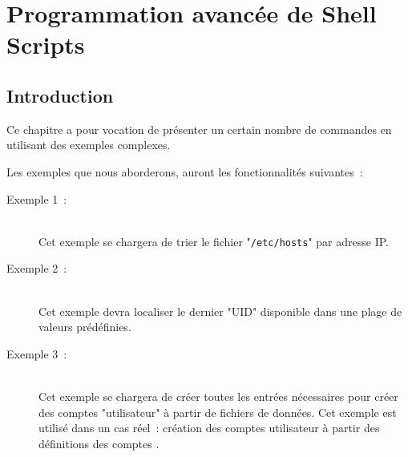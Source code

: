 %
%

\setcounter{remarque-cnt}{1}
\setcounter{example-cnt}{1}
\chapter{\label{adv-programming}Programmation avanc{\'e}e de Shell Scripts}
\thispagestyle{fancy}

\section{Introduction}

Ce chapitre a pour vocation de pr{\'e}senter un certain nombre de commandes
en utilisant des exemples complexes.

Les exemples que nous aborderons, auront les fonctionnalit{\'e}s suivantes~:
\begin{description}
    \item[Exemple 1~:]\mbox{}\\
        Cet exemple se chargera de trier le fichier "{\tt /etc/hosts}"
        par adresse IP.
    \item[Exemple 2~:]\mbox{}\\
        Cet exemple devra localiser le dernier "UID" disponible
        dans une plage de valeurs pr{\'e}d{\'e}finies.
    \item[Exemple 3~:]\mbox{}\\
        Cet exemple se chargera de cr{\'e}er toutes les entr{\'e}es n{\'e}cessaires
        pour cr{\'e}er des comptes "utilisateur" {\`a} partir de fichiers de
        donn{\'e}es. Cet exemple est utilis{\'e} dans un cas r{\'e}el~: cr{\'e}ation
        des comptes utilisateur {\Unix} {\`a} partir des d{\'e}finitions
        des comptes {\OpenVMS}.
\end{description}

